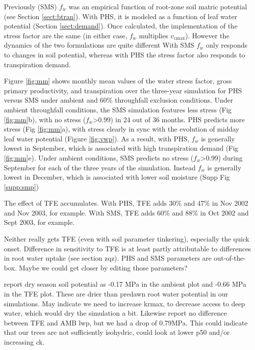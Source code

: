 \documentclass[draft,linenumbers]{agujournal}
\begin{document}
Previously (SMS) $f_w$ was an empirical function of root-zone soil matric potential (see Section \ref{sect:btran}).
With PHS, it is modeled as a function of leaf water potential (Section \ref{sect:demand}).
Once calculated, the implementation of the stress factor are the same (in either case, $f_w$ multiplies $v_{\text{cmax}}$).
However the dynamics of the two formulations are quite different
With SMS $f_w$ only responds to changes in soil potential,
whereas with PHS the stress factor also responds to transpiration demand.

Figure \ref{fig:mm} shows monthly mean values of the water stress factor, gross primary productivity, and transpiration
over the three-year simulation for PHS versus SMS under ambient and 60\% throughfall exclusion conditions.
Under ambient throughfall conditions, the SMS simulation features less stress (Fig \ref{fig:mm}b), with
no stress ($f_w$>0.99) in 24 out of 36 months.
PHS predicts more stress (Fig \ref{fig:mm}a), with stress clearly in sync with the evolution of midday leaf water potential (Figure \ref{fig:vwp}).
As a result, with PHS, $f_w$ is generally lowest in September, which is associated with high transpiration demand (Fig \ref{fig:mm}e).
Under ambient conditions, SMS predicts no stress ($f_w$>0.99) during September for each of the three years of the simulation.
Instead $f_w$ is generally lowest in December, which is associated with lower soil moisture (Supp Fig \ref{supp:smp})

The effect of TFE accumulates.
With PHS, TFE adds 30\% and 47\% in Nov 2002 and Nov 2003, for example.
With SMS, TFE adds 60\% and 88\% in Oct 2002 and Sept 2003, for example.

Neither really gets TFE (even with soil parameter tinkering), especially the quick onset.
Difference in sensitivity to TFE is at least partly attributable to differences in root water uptake (see section zqz).
PHS and SMS parameters are out-of-the-box.
Maybe we could get closer by editing those parameters?

\cite{fisher2006} report dry season soil potential as -0.17 MPa in the ambient plot and -0.66 MPa in the TFE plot.
These are drier than predawn root water potential in our simulations.
May indicate we need to increase krmax, to decrease access to deep water, which would dry the simulation a bit.
Likewise \cite{fisher2006} report no difference between TFE and AMB lwp, but we had a drop of 0.79MPa.
This could indicate that our trees are not sufficiently isohydric, could look at lower p50 and/or increasing ck.
\end{document}
